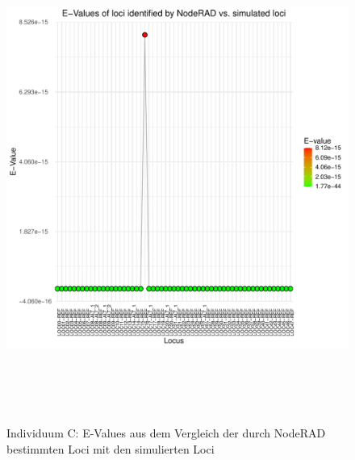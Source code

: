 \begin{figure}[H]
	\begin{center}
		\includegraphics[height=16cm]{bilder/evaluation/evalues/C.plot_evalues.pdf}
		\caption{Individuum C: E-Values aus dem Vergleich der durch NodeRAD bestimmten Loci mit den simulierten Loci}
	\end{center}
\end{figure}

